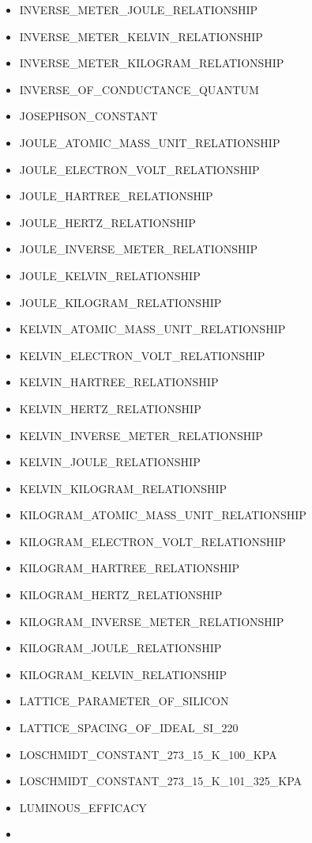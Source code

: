\begin{itemize}
  INVERSE\_METER\_HERTZ\_RELATIONSHIP
\item
  INVERSE\_METER\_JOULE\_RELATIONSHIP
\item
  INVERSE\_METER\_KELVIN\_RELATIONSHIP
\item
  INVERSE\_METER\_KILOGRAM\_RELATIONSHIP
\item
  INVERSE\_OF\_CONDUCTANCE\_QUANTUM
\item
  JOSEPHSON\_CONSTANT
\item
  JOULE\_ATOMIC\_MASS\_UNIT\_RELATIONSHIP
\item
  JOULE\_ELECTRON\_VOLT\_RELATIONSHIP
\item
  JOULE\_HARTREE\_RELATIONSHIP
\item
  JOULE\_HERTZ\_RELATIONSHIP
\item
  JOULE\_INVERSE\_METER\_RELATIONSHIP
\item
  JOULE\_KELVIN\_RELATIONSHIP
\item
  JOULE\_KILOGRAM\_RELATIONSHIP
\item
  KELVIN\_ATOMIC\_MASS\_UNIT\_RELATIONSHIP
\item
  KELVIN\_ELECTRON\_VOLT\_RELATIONSHIP
\item
  KELVIN\_HARTREE\_RELATIONSHIP
\item
  KELVIN\_HERTZ\_RELATIONSHIP
\item
  KELVIN\_INVERSE\_METER\_RELATIONSHIP
\item
  KELVIN\_JOULE\_RELATIONSHIP
\item
  KELVIN\_KILOGRAM\_RELATIONSHIP
\item
  KILOGRAM\_ATOMIC\_MASS\_UNIT\_RELATIONSHIP
\item
  KILOGRAM\_ELECTRON\_VOLT\_RELATIONSHIP
\item
  KILOGRAM\_HARTREE\_RELATIONSHIP
\item
  KILOGRAM\_HERTZ\_RELATIONSHIP
\item
  KILOGRAM\_INVERSE\_METER\_RELATIONSHIP
\item
  KILOGRAM\_JOULE\_RELATIONSHIP
\item
  KILOGRAM\_KELVIN\_RELATIONSHIP
\item
  LATTICE\_PARAMETER\_OF\_SILICON
\item
  LATTICE\_SPACING\_OF\_IDEAL\_SI\_220
\item
  LOSCHMIDT\_CONSTANT\_273\_15\_K\_100\_KPA
\item
  LOSCHMIDT\_CONSTANT\_273\_15\_K\_101\_325\_KPA
\item
  LUMINOUS\_EFFICACY
\item

\end{itemize}
